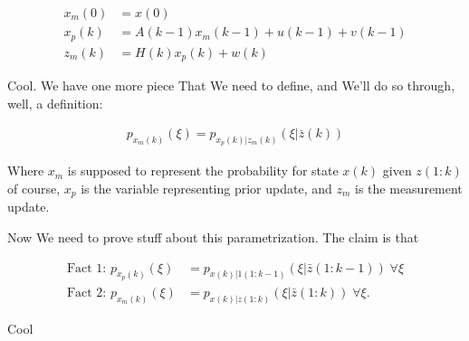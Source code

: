 \documentclass{article}
\begin{document}
		\begin{align}
			x_m(0) &= x(0)\\
			x_p(k) &= A(k-1)x_m(k-1) + u(k-1) + v(k-1)\\
			z_m(k) &= H(k)x_p(k) + w(k)
		\end{align} 
		
		Cool. We have one more piece That We need to define, and We'll do so through, well, a definition:
		
		\begin{align}
			p_{x_m(k)}(\xi) = p_{x_p(k)|z_m(k)}(\xi|\bar{z}(k))
		\end{align}
		
		Where $x_m$ is supposed to represent the probability for state $x(k)$ given $z(1:k)$ of course, $x_p$ is the variable representing prior update, and $z_m$ is the measurement update.
		
		Now We need to prove stuff about this parametrization. The claim is that
		
		\begin{align}
			\text{Fact 1: }p_{x_p(k)}(\xi) &= p_{x(k)|1(1:k-1)}(\xi|\bar{z}(1:k-1))\;\forall\xi\\
			\text{Fact 2: }p_{x_m(k)}(\xi) &= p_{x(k)|z(1:k)}(\xi|\bar{z}(1:k))\;\forall\xi.
		\end{align}
	
		Cool
		
\end{document}
